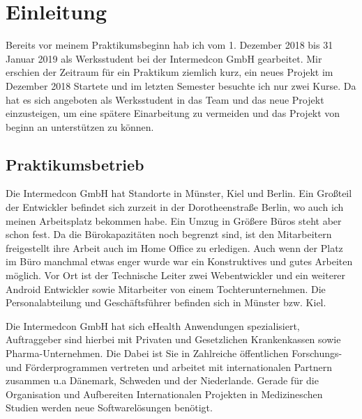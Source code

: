 \chapter{Einleitung}
Bereits vor meinem Praktikumsbeginn hab ich vom 1. Dezember 2018 bis 31 Januar 2019 als Werksstudent bei der Intermedcon GmbH gearbeitet. Mir erschien der Zeitraum für ein Praktikum ziemlich kurz, ein neues Projekt im Dezember 2018 Startete und  im letzten Semester besuchte ich nur zwei Kurse.  Da hat es sich  angeboten als Werksstudent in das Team und das neue Projekt einzusteigen, um eine spätere Einarbeitung zu vermeiden und das Projekt von beginn an unterstützen zu können. 
\section{Praktikumsbetrieb}
Die Intermedcon GmbH hat Standorte in Münster, Kiel und Berlin. Ein Großteil der Entwickler befindet sich  zurzeit in der  Dorotheenstraße Berlin, wo auch ich meinen Arbeitsplatz bekommen habe. Ein Umzug in  Größere Büros steht aber schon fest.  Da die Bürokapazitäten noch begrenzt sind, ist den Mitarbeitern freigestellt ihre Arbeit auch im Home Office zu erledigen. Auch wenn der Platz im Büro manchmal etwas enger wurde war ein Konstruktives und gutes Arbeiten möglich. Vor Ort ist  der Technische Leiter zwei Webentwickler und ein  weiterer Android  Entwickler sowie Mitarbeiter von einem Tochterunternehmen. Die Personalabteilung und Geschäftsführer befinden sich in Münster bzw. Kiel. 

Die  Intermedcon GmbH hat sich eHealth Anwendungen spezialisiert, Auftraggeber sind hierbei mit Privaten und Gesetzlichen Krankenkassen sowie Pharma-Unternehmen. Die Dabei  ist Sie  in Zahlreiche öffentlichen Forschungs- und Förderprogrammen vertreten und arbeitet mit  internationalen Partnern zusammen u.a Dänemark, Schweden und der Niederlande. Gerade für die Organisation und Aufbereiten  Internationalen Projekten in Medizineschen Studien werden neue Softwarelösungen benötigt.



